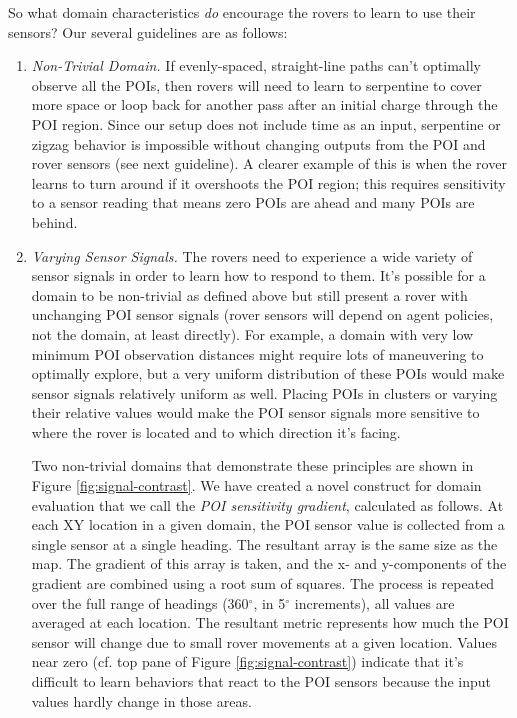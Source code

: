 \documentclass[letterpaper, 10 pt, conference]{ieeeconf}  %
\begin{document}
So what domain characteristics \emph{do} encourage the rovers to learn to use their sensors? Our several guidelines are as follows:

\begin{enumerate}
\item \emph{Non-Trivial Domain.} If evenly-spaced, straight-line paths can't optimally observe all the POIs, then rovers will need to learn to serpentine to cover more space or loop back for another pass after an initial charge through the POI region. Since our setup does not include time as an input, serpentine or zigzag behavior is impossible without changing outputs from the POI and rover sensors (see next guideline). A clearer example of this is when the rover learns to turn around if it overshoots the POI region; this requires sensitivity to a sensor reading that means zero POIs are ahead and many POIs are behind. 

\item \emph{Varying Sensor Signals.} The rovers need to experience a wide variety of sensor signals in order to learn how to respond to them. It's possible for a domain to be non-trivial as defined above but still present a rover with unchanging POI sensor signals (rover sensors will depend on agent policies, not the domain, at least directly). For example, a domain with very low minimum POI observation distances might require lots of maneuvering to optimally explore, but a very uniform distribution of these POIs would make sensor signals relatively uniform as well. Placing POIs in clusters or varying their relative values would make the POI sensor signals more sensitive to where the rover is located and to which direction it's facing. 

Two non-trivial domains that demonstrate these principles are shown in Figure \ref{fig:signal-contrast}. We have created a novel construct for domain evaluation that we call the \emph{POI sensitivity gradient}, calculated as follows. At each XY location in a given domain, the POI sensor value is collected from a single sensor at a single heading. The resultant array is the same size as the map. The gradient of this array is taken, and the x- and y-components of the gradient are combined using a root sum of squares. The process is repeated over the full range of headings (360$^{\circ}$, in 5$^{\circ}$ increments), all values are averaged at each location. The resultant metric represents how much the POI sensor will change due to small rover movements at a given location. Values near zero (cf. top pane of Figure \ref{fig:signal-contrast}) indicate that it's difficult to learn behaviors that react to the POI sensors because the input values hardly change in those areas. 


\end{enumerate}
\end{document}

